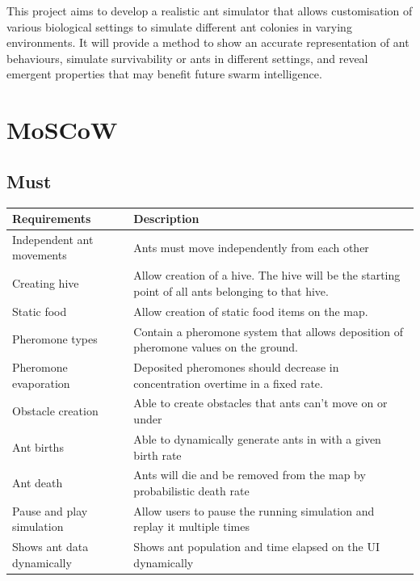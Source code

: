 \documentclass[a4paper, oneside, 11pt]{report}
\begin{document}
This project aims to develop a realistic ant simulator that allows customisation of various biological settings to simulate different ant colonies in varying environments. It will provide a method to show an accurate representation of ant behaviours, simulate survivability or ants in different settings, and reveal emergent properties that may benefit future swarm intelligence.


\section{MoSCoW}
\subsection{Must}
\begin{tabular}{|| p{3.5cm} | p{10.5cm} ||} 
	\hline
	Requirements & Description \\
	\hline
	Independent ant movements & Ants must move independently from each other \\
	\hline
	Creating hive & Allow creation of a hive. The hive will be the starting point of all ants belonging to that hive. \\
	\hline
	Static food & Allow creation of static food items on the map. \\
	\hline
	Pheromone types & Contain a pheromone system that allows deposition of pheromone values on the ground. \\
	\hline
	Pheromone evaporation & Deposited pheromones should decrease in concentration overtime in a fixed rate. \\
	\hline
	Obstacle creation & Able to create obstacles that ants can't move on or under \\
	\hline
	Ant births & Able to dynamically generate ants in with a given birth rate \\
	\hline
	Ant death & Ants will die and be removed from the map by probabilistic death rate \\
	\hline
	Pause and play simulation & Allow users to pause the running simulation and replay it multiple times \\
	\hline
	Shows ant data dynamically & Shows ant population and time elapsed on the UI dynamically  \\
	\hline
\end{tabular}
\end{document}

